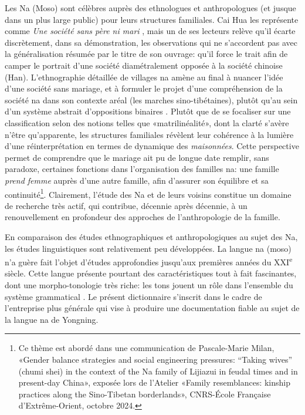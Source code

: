 Les Na (Moso) sont célèbres auprès des ethnologues et anthropologues (et jusque dans un plus large public) pour leurs structures familiales. Cai Hua les représente comme \emph{Une société sans père ni mari} \parencite{cai1997}, mais un de ses lecteurs \parencite[147]{wellens2003} relève qu'il écarte discrètement, dans sa démonstration, les observations qui ne s'accordent pas avec la généralisation résumée par le titre de son ouvrage: qu'il force le trait afin de camper le portrait d'une société diamétralement opposée à la société chinoise (Han). L'ethnographie détaillée de villages na \parencite{milan_tourisme_2019} amène au final à nuancer l'idée d'une société sans mariage, et à formuler le projet d'une compréhension de la société na dans son contexte aréal (les marches sino-tibétaines), plutôt qu'au sein d'un système abstrait d'oppositions binaires \parencite{cai2008}. Plutôt que de se focaliser sur une classification selon des notions telles que «matrilinéalité», dont la clarté s'avère n'être qu'apparente, les structures familiales révèlent leur cohérence à la lumière d'une réinterprétation en termes de dynamique des \emph{maisonnées}. Cette perspective permet de comprendre que le mariage ait pu de longue date remplir, sans paradoxe, certaines fonctions dans l'organisation des familles na: une famille \emph{prend femme} auprès d'une autre famille, afin d'assurer son équilibre et sa continuité\footnote{Ce thème est abordé dans une communication de Pascale-Marie Milan, «Gender balance strategies and social engineering pressures: “Taking wives” (chumi shei) in the context of the Na family of Lijiazui in feudal times and in present-day China», exposée lors de l'Atelier «Family resemblances: kinship practices along the Sino-Tibetan borderlands», CNRS-École Française d'Extrême-Orient, octobre 2024.}. Clairement, l'étude des Na et de leurs voisins constitue un domaine de recherche très actif, qui contribue, décennie après décennie, à un renouvellement en profondeur des approches de l'anthropologie de la famille.

En comparaison des études ethnographiques et anthropologiques au sujet des Na, les études linguistiques sont relativement peu développées. La langue na (moso) n'a guère fait l'objet d'études approfondies jusqu'aux premières années du XXI\textsuperscript{e} siècle. Cette langue présente pourtant des caractéristiques tout à fait fascinantes, dont une morpho-tonologie très riche: les tons jouent un rôle dans l'ensemble du système grammatical \parencite{michaud2017}. Le présent dictionnaire s'inscrit dans le cadre de l'entreprise plus générale qui vise à produire une documentation fiable au sujet de la langue na de Yongning.

